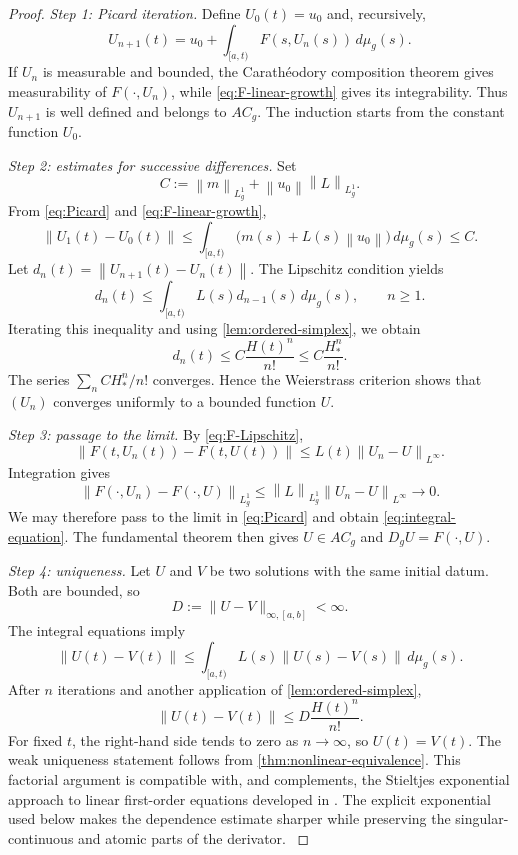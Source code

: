 \documentclass[preprint,12pt]{elsarticle}
\newenvironment{revision}{\begingroup\color{red}}{\endgroup}
\newenvironment{revision}{}{}
\theoremstyle{definition}
\theoremstyle{remark}
\newcommand{\norm}[1]{\left\lVert#1\right\rVert}
\begin{document}
\begin{proof}
\emph{Step 1: Picard iteration.} Define $U_0(t)=u_0$ and, recursively,
\begin{equation}\label{eq:Picard}
 U_{n+1}(t)=u_0+\int_{[a,t)}F(s,U_n(s))\,d\mu_g(s).
\end{equation}
If $U_n$ is measurable and bounded, the Carath\'eodory composition theorem gives measurability of $F(\cdot,U_n)$, while \eqref{eq:F-linear-growth} gives its integrability. Thus $U_{n+1}$ is well defined and belongs to $AC_g$. The induction starts from the constant function $U_0$.

\emph{Step 2: estimates for successive differences.} Set
\[
 C:=\norm{m}_{L_g^1}+\norm{u_0}\norm{L}_{L_g^1}.
\]
From \eqref{eq:Picard} and \eqref{eq:F-linear-growth},
\[
 \norm{U_1(t)-U_0(t)}
 \le\int_{[a,t)}\bigl(m(s)+L(s)\norm{u_0}\bigr)\,d\mu_g(s)
 \le C.
\]
Let $d_n(t)=\norm{U_{n+1}(t)-U_n(t)}$. The Lipschitz condition yields
\[
 d_n(t)\le\int_{[a,t)}L(s)d_{n-1}(s)\,d\mu_g(s),\qquad n\ge1.
\]
Iterating this inequality and using \cref{lem:ordered-simplex}, we obtain
\begin{equation}\label{eq:Picard-factorial}
 d_n(t)\le C\frac{H(t)^n}{n!}
 \le C\frac{H_*^n}{n!}.
\end{equation}
The series $\sum_n C H_*^n/n!$ converges. Hence the Weierstrass criterion shows that $(U_n)$ converges uniformly to a bounded function $U$.

\emph{Step 3: passage to the limit.} By \eqref{eq:F-Lipschitz},
\[
 \norm{F(t,U_n(t))-F(t,U(t))}
 \le L(t)\norm{U_n-U}_{L^\infty}.
\]
Integration gives
\[
 \norm{F(\cdot,U_n)-F(\cdot,U)}_{L_g^1}
 \le \norm{L}_{L_g^1}\norm{U_n-U}_{L^\infty}\longrightarrow0.
\]
We may therefore pass to the limit in \eqref{eq:Picard} and obtain \eqref{eq:integral-equation}. The fundamental theorem then gives $U\in AC_g$ and $D_gU=F(\cdot,U)$.

\emph{Step 4: uniqueness.} Let $U$ and $V$ be two solutions with the same initial datum. Both are bounded, so
\[
 D:=\|U-V\|_{\infty,[a,b]}<\infty.
\]
The integral equations imply
\[
 \norm{U(t)-V(t)}\le\int_{[a,t)}L(s)\norm{U(s)-V(s)}\,d\mu_g(s).
\]
After $n$ iterations and another application of \cref{lem:ordered-simplex},
\[
 \norm{U(t)-V(t)}\le D\frac{H(t)^n}{n!}.
\]
For fixed $t$, the right-hand side tends to zero as $n\to\infty$, so $U(t)=V(t)$. The weak uniqueness statement follows from \cref{thm:nonlinear-equivalence}.
\begin{revision}
This factorial argument is compatible with, and complements, the Stieltjes
exponential approach to linear first-order equations developed in
\cite{FerMarToj22}.  The explicit exponential used below makes the dependence
estimate sharper while preserving the singular-continuous and atomic parts of
the derivator.
\end{revision}
\end{proof}
\end{document}
